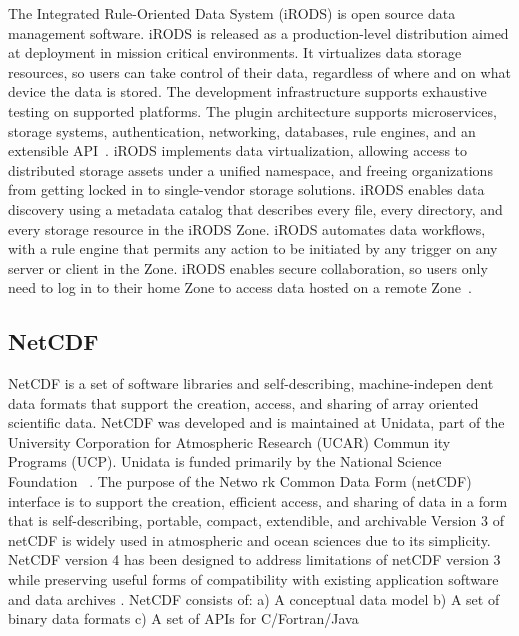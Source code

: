 {The Integrated Rule-Oriented Data System (iRODS) is open source data
management software. iRODS is released as a production-level
distribution aimed at deployment in mission critical environments. It
virtualizes data storage resources, so users can take control of their
data, regardless of where and on what device the data is stored. The
development infrastructure supports exhaustive testing on supported
platforms. The plugin architecture supports microservices, storage
systems, authentication, networking, databases, rule engines, and an
extensible API~\cite{irods-www}.  iRODS implements data
virtualization, allowing access to distributed storage assets under a
unified namespace, and freeing organizations from getting locked in to
single-vendor storage solutions. iRODS enables data discovery using a
metadata catalog that describes every file, every directory, and every
storage resource in the iRODS Zone. iRODS automates data workflows,
with a rule engine that permits any action to be initiated by any
trigger on any server or client in the Zone. iRODS enables secure
collaboration, so users only need to log in to their home Zone to
access data hosted on a remote Zone~\cite{github-irods-www}.

     \pv


\subsection{NetCDF}

NetCDF is a set of software libraries and self-describing,
machine-indepen dent data formats that support the creation, access,
and sharing of array oriented scientific data. NetCDF was developed
and is maintained at Unidata, part of the University Corporation for
Atmospheric Research (UCAR) Commun ity Programs (UCP). Unidata is
funded primarily by the National Science Foundation
\cite{paper-netCDF}~\cite{www-netcdf}. The purpose of the Netwo rk
Common Data Form (netCDF) interface is to support the creation,
efficient access, and sharing of data in a form that is
self-describing, portable, compact, extendible, and archivable Version
3 of netCDF is widely used in atmospheric and ocean sciences due to
its simplicity. NetCDF version 4 has been designed to address
limitations of netCDF version 3 while preserving useful forms of
compatibility with existing application software and data archives
\cite{paper-netCDF}.  NetCDF consists of: a) A conceptual data model
b) A set of binary data formats c) A set of APIs for C/Fortran/Java

}
